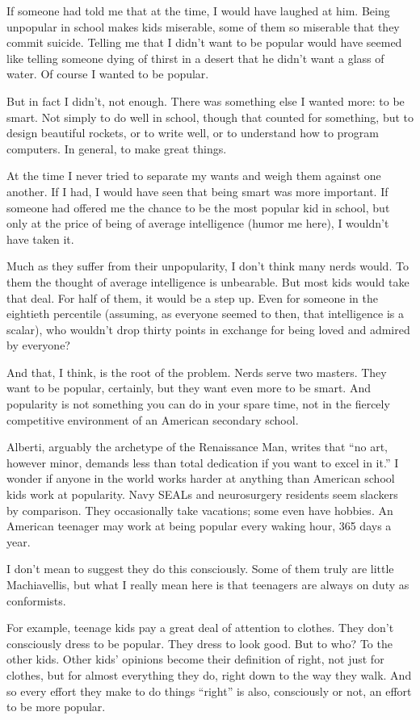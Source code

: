 \documentclass[12pt]{book}
\begin{document}
If someone had told me that at the time, I would have laughed at him.
Being unpopular in school makes kids miserable, some of them so
miserable that they commit suicide. Telling me that I didn't want to be
popular would have seemed like telling someone dying of thirst in a
desert that he didn't want a glass of water. Of course I wanted to be
popular.

But in fact I didn't, not enough. There was something else I wanted
more: to be smart. Not simply to do well in school, though that counted
for something, but to design beautiful rockets, or to write well, or to
understand how to program computers. In general, to make great things.

At the time I never tried to separate my wants and weigh them against
one another. If I had, I would have seen that being smart was more
important. If someone had offered me the chance to be the most popular
kid in school, but only at the price of being of average intelligence
(humor me here), I wouldn't have taken it.

Much as they suffer from their unpopularity, I don't think many nerds
would. To them the thought of average intelligence is unbearable. But
most kids would take that deal. For half of them, it would be a step up.
Even for someone in the eightieth percentile (assuming, as everyone
seemed to then, that intelligence is a scalar), who wouldn't drop thirty
points in exchange for being loved and admired by everyone?

And that, I think, is the root of the problem. Nerds serve two masters.
They want to be popular, certainly, but they want even more to be smart.
And popularity is not something you can do in your spare time, not in
the fiercely competitive environment of an American secondary school.

Alberti, arguably the archetype of the Renaissance Man, writes that ``no
art, however minor, demands less than total dedication if you want to
excel in it.'' I wonder if anyone in the world works harder at anything
than American school kids work at popularity. Navy SEALs and
neurosurgery residents seem slackers by comparison. They occasionally
take vacations; some even have hobbies. An American teenager may work at
being popular every waking hour, 365 days a year.

I don't mean to suggest they do this consciously. Some of them truly are
little Machiavellis, but what I really mean here is that teenagers are
always on duty as conformists.

For example, teenage kids pay a great deal of attention to clothes. They
don't consciously dress to be popular. They dress to look good. But to
who? To the other kids. Other kids' opinions become their definition of
right, not just for clothes, but for almost everything they do, right
down to the way they walk. And so every effort they make to do things
``right'' is also, consciously or not, an effort to be more popular.
\end{document}
